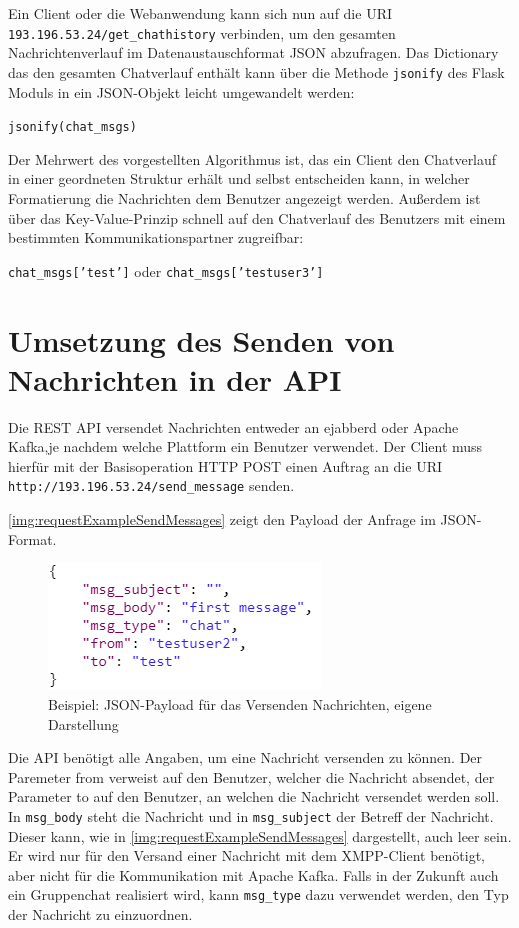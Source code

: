 \documentclass[a4paper,titlepage,halfparskip,12pt]{scrreprt}
\begin{document}
\begin{onehalfspacing}
Ein Client oder die Webanwendung kann sich nun auf die \acs{URI} \texttt{193.196.53.24/get\_chathistory} verbinden, um den gesamten Nachrichtenverlauf im Datenaustauschformat \acs{JSON} abzufragen. Das Dictionary das den gesamten Chatverlauf enthält kann über die Methode \texttt{jsonify} des Flask Moduls in ein JSON-Objekt leicht umgewandelt werden:

\texttt{jsonify(chat\_msgs)}

Der Mehrwert des vorgestellten Algorithmus ist, das ein Client den Chatverlauf in einer geordneten Struktur erhält und selbst entscheiden kann, in welcher Formatierung die Nachrichten dem Benutzer angezeigt werden. Außerdem ist über das Key-Value-Prinzip schnell auf den Chatverlauf des Benutzers mit einem bestimmten Kommunikationspartner zugreifbar:

\texttt{chat\_msgs['test']} oder \texttt{chat\_msgs['testuser3']}

\pagebreak

\section{Umsetzung des Senden von Nachrichten in der \acs{API}}

Die \acs{REST} \acs{API} versendet Nachrichten entweder an ejabberd oder Apache Kafka,je nachdem welche Plattform ein Benutzer verwendet. Der Client muss hierfür mit der Basisoperation \acs{HTTP} POST einen Auftrag an die \acs{URI} \texttt{http://193.196.53.24/send\_message} senden.

\autoref{img:requestExampleSendMessages} zeigt den Payload der Anfrage im \acs{JSON}-Format.

\begin{figure}[h]
	\centering
	\includegraphics[width=.5\textwidth]{images/requestExampleSendMessages}
	\caption{Beispiel: \acs{JSON}-Payload für das Versenden Nachrichten, eigene Darstellung}
	\label{img:requestExampleSendMessages}
\end{figure}

Die \acs{API} benötigt alle Angaben, um eine Nachricht versenden zu können. Der Paremeter from verweist auf den Benutzer, welcher die Nachricht absendet, der Parameter to auf den Benutzer, an welchen die Nachricht versendet werden soll. In \texttt{msg\_body} steht die Nachricht und in \texttt{msg\_subject} der Betreff der Nachricht. Dieser kann, wie in \autoref{img:requestExampleSendMessages} dargestellt, auch leer sein. Er wird nur für den Versand einer Nachricht mit dem \acs{XMPP}-Client benötigt, aber nicht für die Kommunikation mit Apache Kafka. Falls in der Zukunft auch ein Gruppenchat realisiert wird, kann \texttt{msg\_type} dazu verwendet werden, den Typ der Nachricht zu einzuordnen.


\end{onehalfspacing}
\end{document}
